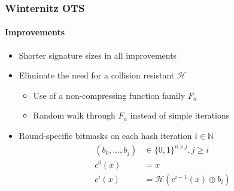 \documentclass[12pt]{beamer}
\newcommand{\hh}{$\mathcal{H}$}
\begin{document}
\begin{frame}
  \frametitle{Winternitz OTS}
  \framesubtitle{Improvements}
  \begin{itemize}
    \item Shorter signature sizes in all improvements
    \item Eliminate the need for a collision resistant \hh{}
    \begin{itemize}
      \item Use of a non-compressing function family $F_n$
      \item Random walk through $F_n$ instead of simple iterations
    \end{itemize}
    \item Round-specific bitmasks on each hash iteration $i \in \mathbb{N}$
    \begin{align*}
      (b_0, \dots, b_j) &\in \{0,1\}^{n \times j}, j \geq i \\
      c^0(x) &= x \\
      c^i(x) &= \mathcal{H}(c^{i-1}(x) \oplus b_i)
    \end{align*}
  \end{itemize}
\end{frame}
\end{document}
